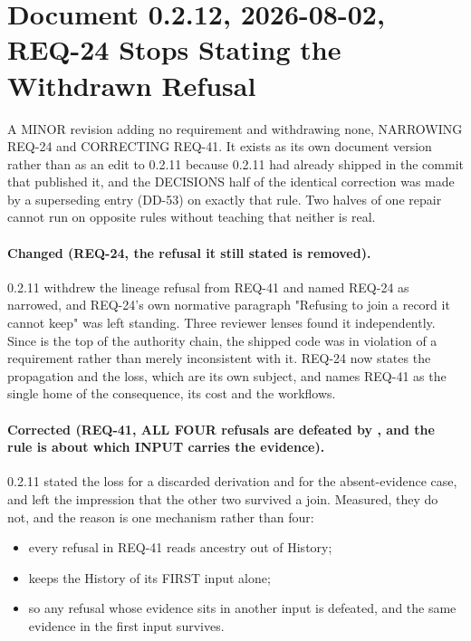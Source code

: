 \section*{Document 0.2.12, 2026-08-02, REQ-24 Stops Stating the Withdrawn Refusal}

A MINOR revision adding no requirement and withdrawing none, NARROWING
REQ-24 and CORRECTING REQ-41. It exists as its own document version
rather than as an edit to 0.2.11 because 0.2.11 had already shipped in
the commit that published it, and the DECISIONS half of the identical
correction was made by a superseding entry (DD-53) on exactly that rule.
Two halves of one repair cannot run on opposite rules without teaching
that neither is real.

\paragraph{Changed (REQ-24, the refusal it still stated is removed).}
0.2.11 withdrew the  lineage refusal from REQ-41 and named
REQ-24 as narrowed, and REQ-24's own normative paragraph "Refusing to
join a record it cannot keep" was left standing. Three reviewer lenses
found it independently. Since  is the top of the
authority chain, the shipped code was in violation of a \stable{}
requirement rather than merely inconsistent with it. REQ-24 now states
the propagation and the loss, which are its own subject, and names
REQ-41 as the single home of the consequence, its cost and the
workflows.

\paragraph{Corrected (REQ-41, ALL FOUR refusals are defeated by
, and the rule is about which INPUT carries the evidence).}
0.2.11 stated the loss for a discarded derivation and for the
absent-evidence case, and left the impression that the other two
survived a join. Measured, they do not, and the reason is one mechanism
rather than four:

\begin{itemize}[noitemsep,topsep=2pt]
  \item every refusal in REQ-41 reads ancestry out of History;
  \item {} keeps the History of its FIRST input alone;
  \item so any refusal whose evidence sits in another input is defeated,
    and the same evidence in the first input survives.
\end{itemize}

